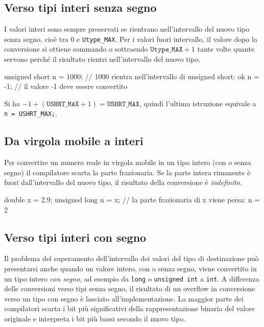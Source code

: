 \documentclass[11pt,a4paper]{article}
\begin{document}
\subsection{Verso tipi interi senza segno}

I valori interi sono sempre preservati se rientrano nell'intervallo del nuovo tipo senza segno, cioè tra $0$ e \lstinline|Utype_MAX|. Per i valori fuori intervallo, il valore dopo la conversione si ottiene sommando o sottraendo $\mathtt{Utype\_MAX} + 1$ tante volte quante servono perché il risultato rientri nell'intervallo del nuovo tipo.

\begin{codice}
unsigned short n = 1000;   // 1000 rientra nell'intervallo di unsigned short: ok
n = -1;                    // il valore -1 deve essere convertito
\end{codice}

Si ha $-1 + (\mathtt{USHRT\_MAX} + 1) = \mathtt{USHRT\_MAX}$, quindi l'ultima istruzione equivale a \lstinline|n = USHRT_MAX;|.

\subsection{Da virgola mobile a interi}

Per convertire un numero reale in virgola mobile in un tipo intero (con o senza segno) il compilatore scarta la parte frazionaria. Se la parte intera rimanente è fuori dall'intervallo del nuovo tipo, il risultato della conversione è \emph{indefinito}.

\begin{codice}
double x = 2.9;
unsigned long n = x;   // la parte frazionaria di x viene persa: n = 2
\end{codice}

\subsection{Verso tipi interi con segno}

Il problema del superamento dell'intervallo dei valori del tipo di destinazione può presentarsi anche quando un valore intero, con o senza segno, viene convertito in un tipo intero \emph{con segno}, ad esempio da \lstinline|long| o \lstinline|unsigned int| a \lstinline|int|. A differenza delle conversioni verso tipi senza segno, il risultato di un overflow in conversione verso un tipo con segno è lasciato all'implementazione. La maggior parte dei compilatori scarta i bit più significativi della rappresentazione binaria del valore originale e interpreta i bit più bassi secondo il nuovo tipo.
\end{document}
